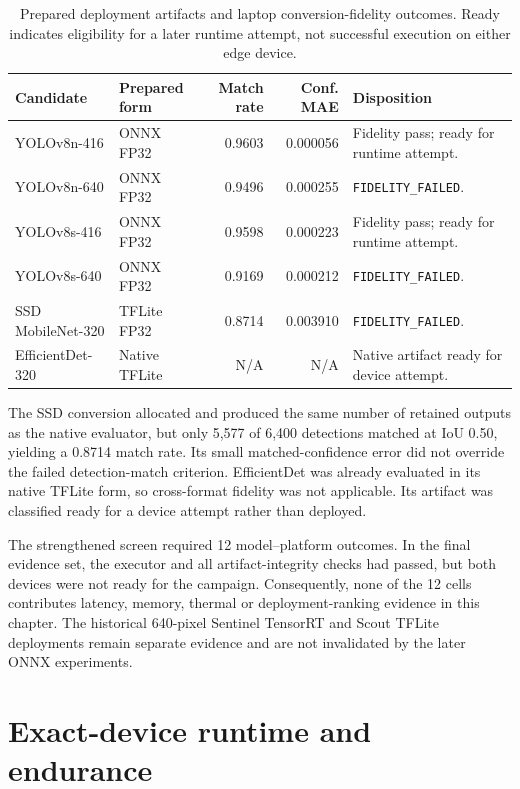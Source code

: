 \begin{table}[H]
  \centering
  \caption{Prepared deployment artifacts and laptop conversion-fidelity
  outcomes. Ready indicates eligibility for a later runtime attempt, not
  successful execution on either edge device.}
  \label{tab:conversion-results}
  \scriptsize
  \begin{tabularx}{\textwidth}{@{}p{}p{}rrX@{}}
    \toprule
    Candidate & Prepared form & Match rate & Conf. MAE & Disposition \\
    \midrule
    YOLOv8n-416 & ONNX FP32 & 0.9603 & 0.000056 & Fidelity pass; ready for runtime attempt. \\
    YOLOv8n-640 & ONNX FP32 & 0.9496 & 0.000255 & \texttt{FIDELITY\_FAILED}. \\
    YOLOv8s-416 & ONNX FP32 & 0.9598 & 0.000223 & Fidelity pass; ready for runtime attempt. \\
    YOLOv8s-640 & ONNX FP32 & 0.9169 & 0.000212 & \texttt{FIDELITY\_FAILED}. \\
    SSD MobileNet-320 & TFLite FP32 & 0.8714 & 0.003910 & \texttt{FIDELITY\_FAILED}. \\
    EfficientDet-320 & Native TFLite & N/A & N/A & Native artifact ready for device attempt. \\
    \bottomrule
  \end{tabularx}
\end{table}

The SSD conversion allocated and produced the same number of retained outputs
as the native evaluator, but only 5,577 of 6,400 detections matched at IoU
0.50, yielding a 0.8714 match rate. Its small matched-confidence error did not
override the failed detection-match criterion. EfficientDet was already
evaluated in its native TFLite form, so cross-format fidelity was not
applicable. Its artifact was classified ready for a device attempt rather than
deployed.

The strengthened screen required 12 model--platform outcomes. In the final
evidence set,
the executor and all artifact-integrity checks had passed, but both devices
were not ready for the campaign. Consequently, none of the 12 cells contributes
latency, memory, thermal or deployment-ranking evidence in this chapter. The
historical 640-pixel Sentinel TensorRT and Scout TFLite deployments remain
separate evidence and are not invalidated by the later ONNX experiments.

\section{Exact-device runtime and endurance}
\label{sec:results:3}

